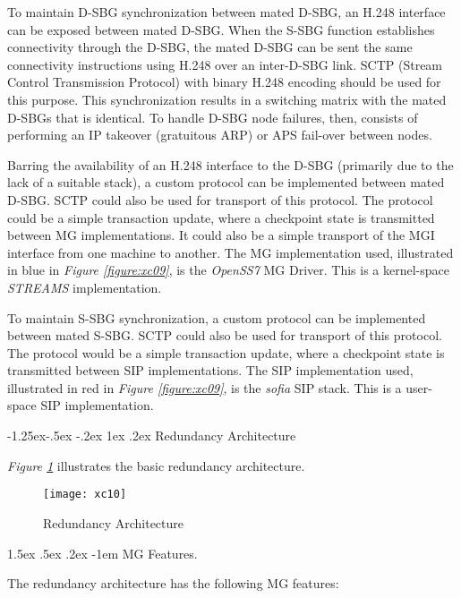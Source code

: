 \documentclass[letterpaper,final,notitlepage,twocolumn,10pt,twoside]{article}
\makeatletter
\let\normalsize = \small
\let\small = \footnotesize
\let\footnotesize = \scriptsize
\let\scriptsize = \tiny
\renewcommand\subsubsection{\@startsection{subsubsection}{3}{\z@}%
                                     {-1.25ex\@plus -.5ex \@minus -.2ex}%
                                     {1ex \@plus .2ex}%
                                     {\normalfont\normalsize\bfseries}}
\renewcommand\paragraph{\@startsection{paragraph}{4}{\z@}%
                                    {1.5ex \@plus .5ex \@minus .2ex}%
                                    {-1em}%
                                    {\normalfont\normalsize\bfseries\slshape}}
\makeatother
\begin{document}
To maintain D-SBG synchronization between mated D-SBG, an H.248 interface can be
exposed between mated D-SBG.  When the S-SBG function establishes connectivity
through the D-SBG, the mated D-SBG can be sent the same connectivity
instructions using H.248 over an inter-D-SBG link.  SCTP (Stream Control
Transmission Protocol) with binary H.248 encoding should be used for this
purpose.  This synchronization results in a switching matrix with the mated
D-SBGs that is identical.  To handle D-SBG node failures, then, consists of
performing an IP takeover (gratuitous ARP) or APS fail-over between nodes.

Barring the availability of an H.248 interface to the D-SBG (primarily due to
the lack of a suitable stack), a custom protocol can be implemented between
mated D-SBG.  SCTP could also be used for transport of this protocol.  The
protocol could be a simple transaction update, where a checkpoint state is
transmitted between MG implementations.  It could also be a simple transport
of the MGI interface from one machine to another.  The MG implementation used,
illustrated in blue in {\sl Figure \ref{figure:xc09}}, is the {\sl OpenSS7} MG
Driver.  This is a kernel-space {\sl STREAMS} implementation.

To maintain S-SBG synchronization, a custom protocol can be implemented between
mated S-SBG.  SCTP could also be used for transport of this protocol.  The
protocol would be a simple transaction update, where a checkpoint state is
transmitted between SIP implementations.  The SIP implementation used,
illustrated in red in {\sl Figure \ref{figure:xc09}}, is the {\sl sofia} SIP
stack.  This is a user-space SIP implementation.

\subsubsection{Redundancy Architecture}

{\sl Figure \ref{figure:xc10}} illustrates the basic redundancy architecture.

\begin{figure}[htp]
\center\texttt{[image: xc10]}
\caption{Redundancy Architecture}
\label{figure:xc10}
\end{figure}

\paragraph{MG Features.}

The redundancy architecture has the following MG features:
\end{document}
